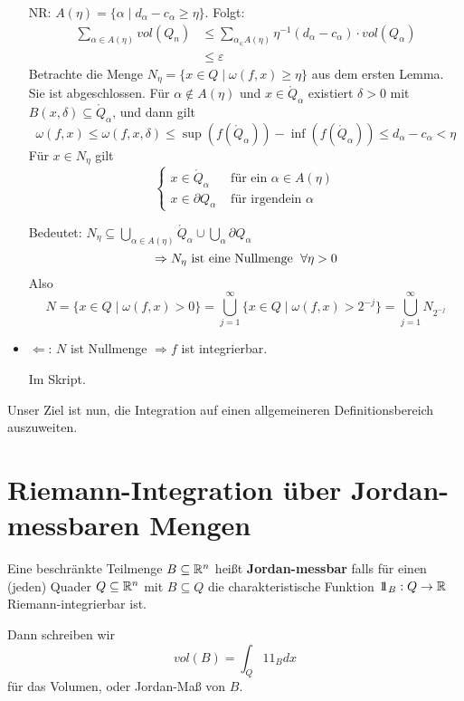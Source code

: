 \documentclass[main.tex]{subfiles}
\begin{document}
\begin{Beweis}
\begin{itemize}
    NR: $A(\eta) = \{\alpha \mid d_\alpha - c_\alpha \geq \eta\}$. Folgt:
    $$\begin{aligned}
      \sum \limits_{\alpha \in A(\eta)} vol(Q_n) & \leq \sum \limits_{\alpha_\in A(\eta)} \eta^{-1}(d_\alpha - c_\alpha) \cdot vol(Q_\alpha) \\
      & \leq \varepsilon
    \end{aligned}$$
    Betrachte die Menge $N_\eta = \{x \in Q \mid \omega(f,x) \geq \eta\}$ aus dem ersten Lemma. Sie ist abgeschlossen. Für $\alpha \notin A(\eta)$ und $x \in \mathring{Q}_\alpha$ existiert $\delta > 0$ mit $B(x,\delta) \subseteq \mathring{Q}_\alpha$, und dann gilt
    \[ \omega(f,x) \leq \omega(f,x,\delta) \leq \sup(f(\mathring{Q}_\alpha)) - \inf(f(\mathring{Q}_\alpha)) \leq d_\alpha - c_\alpha < \eta \]
    Für $x \in N_\eta$ gilt
    $$\left\{\begin{aligned}
      x \in \mathring{Q}_\alpha & \text{ für ein } \alpha \in A(\eta) \\
      x \in \partial Q_\alpha & \text{ für irgendein } \alpha
    \end{aligned}\right.$$

    Bedeutet: $N_\eta \subseteq \bigcup_{\alpha \in A(\eta)} \mathring{Q}_\alpha \cup \bigcup_\alpha \partial Q_\alpha$
    $$\Rightarrow N_\eta \text{ ist eine Nullmenge } \;\forall \eta > 0$$
    Also
    $$N = \{x \in Q \mid \omega(f,x) > 0\} = \bigcup_{j = 1}^\infty \{x \in Q \mid \omega(f,x) > 2^{-j}\} = \bigcup_{j=1}^\infty N_{2^{-j}}$$

    \item $\Leftarrow$: $N$ ist Nullmenge $\Rightarrow f$ ist integrierbar.

    Im Skript.
  \end{itemize}
\end{Beweis}

Unser Ziel ist nun, die Integration auf einen allgemeineren Definitionsbereich auszuweiten.


\section{Riemann-Integration über Jordan-messbaren Mengen}

\begin{Definition}
  Eine beschränkte Teilmenge $B \subseteq \mathbb{R}^n$ heißt \textbf{Jordan-messbar} falls für einen (jeden) Quader $Q \subseteq \mathbb{R}^n$ mit $B \subseteq Q$ die charakteristische Funktion $1\!\!1_B :Q \to \mathbb{R}$ Riemann-integrierbar ist.

  Dann schreiben wir
  $$vol(B) = \int_Q 1\!\!1_B dx$$
  für das Volumen, oder Jordan-Maß von $B$.
\end{Definition}
\end{document}
